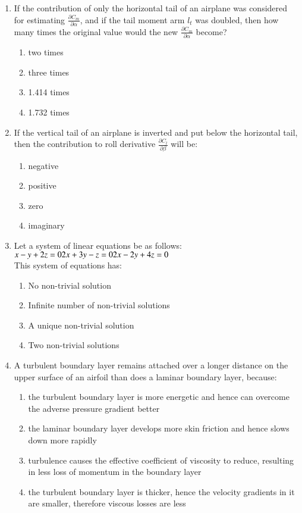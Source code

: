 \documentclass[journal]{IEEEtran}
\numberwithin{equation}{enumi}
\numberwithin{figure}{enumi}
\begin{document}
\begin{enumerate}[start=35]
    \item If the contribution of only the horizontal tail of an airplane was considered for estimating $\frac{\partial C_m}{\partial \alpha}$, and if the tail moment arm $l_t$ was doubled, then how many times the original value would the new $\frac{\partial C_m}{\partial \alpha}$ become?
    \begin{enumerate}
        \item two times
        \item three times
        \item 1.414 times
        \item 1.732 times
    \end{enumerate}

    \item If the vertical tail of an airplane is inverted and put below the horizontal tail, then the contribution to roll derivative $\frac{\partial C_l}{\partial \beta}$ will be:
    \begin{enumerate}
        \item negative
        \item positive
        \item zero
        \item imaginary
    \end{enumerate}

    \item Let a system of linear equations be as follows:\\
    $x - y + 2z = 0\\
    2x + 3y - z = 0\\
    2x - 2y + 4z = 0$\\
    This system of equations has:
    \begin{enumerate}
        \item No non-trivial solution
        \item Infinite number of non-trivial solutions
        \item A unique non-trivial solution
        \item Two non-trivial solutions
    \end{enumerate}

    \item A turbulent boundary layer remains attached over a longer distance on the upper surface of an airfoil than does a laminar boundary layer, because:
    \begin{enumerate}
        \item the turbulent boundary layer is more energetic and hence can overcome the adverse pressure gradient better
        \item the laminar boundary layer develops more skin friction and hence slows down more rapidly
        \item turbulence causes the effective coefficient of viscosity to reduce, resulting in less loss of momentum in the boundary layer
        \item the turbulent boundary layer is thicker, hence the velocity gradients in it are smaller, therefore viscous losses are less
    \end{enumerate}


\end{enumerate}
\end{document}
